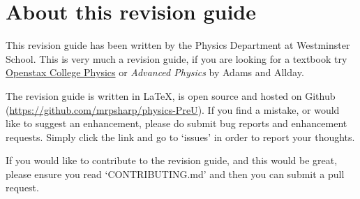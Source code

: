 \documentclass[main.tex]{subfiles}
\begin{document}
\chapter{About this revision guide}

This revision guide has been written by the Physics Department at Westminster School. This is very much a revision guide, if you are looking for a textbook try \href{https://openstax.org/details/books/college-physics}{Openstax College Physics} or \emph{Advanced Physics} by Adams and Allday.

The revision guide is written in \LaTeX, is open source and hosted on Github (\url{https://github.com/mrpsharp/physics-PreU}). If you find a mistake, or would like to suggest an enhancement, please do submit bug reports and enhancement requests. Simply click the link and go to `issues' in order to report your thoughts.

If you would like to contribute to the revision guide, and this would be great, please ensure you read `CONTRIBUTING.md' and then you can submit a pull request.
\end{document}
